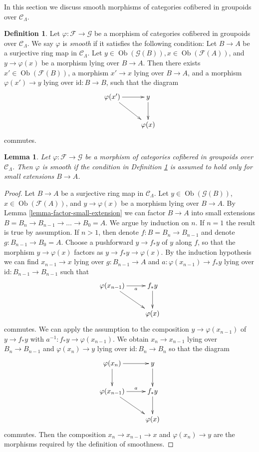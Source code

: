 \documentclass{stacks-project}
\theoremstyle{plain}
\newtheorem{lemma}[subsection]{Lemma}
\theoremstyle{definition}
\newtheorem{definition}[subsection]{Definition}
\theoremstyle{remark}
\numberwithin{equation}{subsection}
\def\Ob{\mathop{\mathrm{Ob}}\nolimits}
\begin{document}
\noindent
In this section we discuss smooth morphisms of categories
cofibered in groupoids over $\mathcal{C}_\Lambda$.

\begin{definition}
\label{definition-smooth-morphism}
Let $\varphi : \mathcal{F} \to \mathcal{G}$ be a morphism of categories
cofibered in groupoids over $\mathcal{C}_\Lambda$.  We say  $\varphi$ is
{\it smooth} if it satisfies the following condition: Let $B \to A$ be
a surjective ring map in $\mathcal{C}_\Lambda$.  Let $y \in
\Ob(\mathcal{G}(B)), x \in \Ob(\mathcal{F}(A))$, and $y
\to \varphi(x)$ be a morphism lying over $B \to A$.  Then there
exists $x' \in \Ob(\mathcal{F}(B))$, a morphism $x' \to x$
lying over $B \to A$, and a morphism $\varphi(x') \to y$ lying
over $\text{id}: B \to B$, such that the diagram
$$
\xymatrix{
\varphi(x') \ar[r] \ar[dr] & y \ar[d] \\
& \varphi(x)
}
$$
commutes.
\end{definition}

\begin{lemma}
\label{lemma-smoothness-small-extensions}
Let $\varphi : \mathcal{F} \to \mathcal{G}$ be a morphism of categories
cofibered in groupoids over $\mathcal{C}_\Lambda$.  Then $\varphi$ is smooth
if the condition in Definition \ref{definition-smooth-morphism} is assumed to
hold only for small extensions $B \to A$.
\end{lemma}

\begin{proof}
Let $B \to A$ be a surjective ring map in $\mathcal{C}_\Lambda$.
Let $y \in \Ob(\mathcal{G}(B))$, $x \in \Ob(\mathcal{F}(A))$,
and $y \to \varphi(x)$ be a morphism lying over $B \to A$. By
Lemma \ref{lemma-factor-small-extension} we can factor $B \to A$ into
small extensions $B = B_n \to B_{n-1} \to \ldots \to B_0 = A$.
We argue by induction on $n$. If $n = 1$ the result is true by assumption.
If $n > 1$, then denote $f : B = B_n \to B_{n - 1}$ and denote
$g : B_{n - 1} \to B_0 = A$. Choose a pushforward
$y \to f_* y$ of $y$ along $f$, so that the morphism $y \to \varphi(x)$
factors as $y \to f_* y \to \varphi(x)$. By the induction hypothesis
we can find $x_{n - 1} \to x$ lying over $g : B_{n - 1} \to A$ and
$a : \varphi(x_{n - 1}) \to f_*y$ lying over
$\text{id} : B_{n - 1} \to B_{n - 1}$ such that
$$
\xymatrix{
\varphi(x_{n - 1}) \ar[r]_-a \ar[dr] & f_*y \ar[d] \\
& \varphi(x)
}
$$
commutes. We can apply the assumption to the composition
$y \to \varphi(x_{n - 1})$ of
$y \to f_*y$ with $a^{-1} : f_*y \to \varphi(x_{n - 1})$. We obtain
$x_n \to x_{n - 1}$ lying over $B_n \to B_{n - 1}$ and
$\varphi(x_n) \to y$ lying over  $\text{id} : B_n \to B_n$ so that the diagram
$$
\xymatrix{
\varphi(x_n) \ar[r] \ar[d] & y \ar[d] \\
\varphi(x_{n - 1}) \ar[r]^-a \ar[dr] & f_*y \ar[d] \\
& \varphi(x)
}
$$
commutes. Then the composition $x_n \to x_{n - 1} \to x$ and
$\varphi(x_n) \to y$ are the morphisms required by the definition of
smoothness.
\end{proof}
\end{document}
